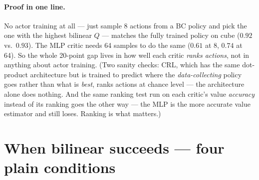 \documentclass[10pt]{article}
\begin{document}
\paragraph{Proof in one line.} No actor training at all --- just sample 8 actions from a
BC policy and pick the one with the highest bilinear $Q$ --- matches the fully trained
policy on cube ($0.92$ vs.\ $0.93$). The MLP critic needs 64 samples to do the same
($0.61$ at 8, $0.74$ at 64). So the whole 20-point gap lives in how well each critic
\emph{ranks actions}, not in anything about actor training. (Two sanity checks: CRL,
which has the same dot-product architecture but is trained to predict where the
\emph{data-collecting} policy goes rather than what is \emph{best}, ranks actions at
chance level --- the architecture alone does nothing. And the same ranking test run on
each critic's value \emph{accuracy} instead of its ranking goes the other way --- the MLP
is the more accurate value estimator and still loses. Ranking is what matters.)

\section{When bilinear succeeds --- four plain conditions}\label{sec:when}
\end{document}
